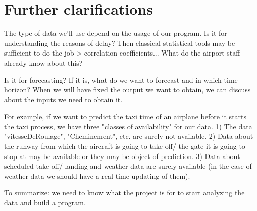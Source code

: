 \documentclass{article}
\begin{document}
\section*{Further clarifications}
The type of data we'll use depend on the usage of our program. 
Is it for understanding the reasons of delay? Then classical statistical tools may be sufficient to do the job-> correlation coefficients... What do the airport staff already know about this? 


Is it for forecasting? If it is, what do we want to forecast and in which time horizon? 
When we will have fixed the output we want to obtain, we can discuss about the inputs we need to obtain it. 

For example, if we want to predict the taxi time of an airplane before it starts the taxi process, we have three "classes of availability" for our data. 1) The data "vitesseDeRoulage", "Cheminement", etc.  are surely not available. 2) Data about the runway from which the aircraft is going to take off/ the gate it is going to stop at may be available or they may be object of prediction. 3) Data about scheduled take off/ landing and weather data are surely available (in the case of weather data we should have a real-time updating of them).

To summarize: we need to know what the project is for to start analyzing the data and build a program.
\end{document}
